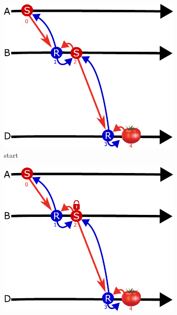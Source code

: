 \documentclass[a4paper,USenglish,cleveref, autoref, thm-restate, anonymous]{lipics-v2021}
\begin{document}
\begin{figure}[t]
\caption{Steps to generate a \emph{reduce proof} for $B$ in resource 4's DAG~(\cref{fig:salad}).
         The proof itself has a state root for $A$, $B$, and $D$, and shows they have the \emph{send} and \emph{receive} objects in \textbf{(d)}.}
\begin{subfigure}{.19\textwidth}
  \centering
  \includegraphics[width=\linewidth]{figs/sends_and_receives_start.pdf}  
  \caption{start}
  \label{fig:start}
\end{subfigure}
\begin{subfigure}{.19\textwidth}
  \centering
  \includegraphics[width=\linewidth]{figs/sends_and_receives_send_lock.pdf}  

\end{subfigure}
\end{figure}
\end{document}
